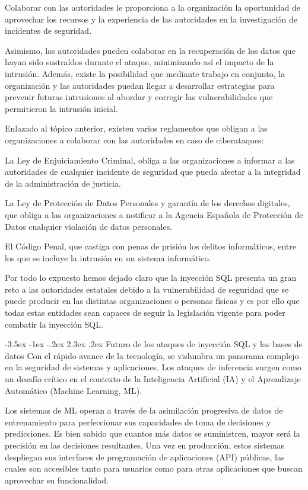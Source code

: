 \documentclass[11pt]{report}
\makeatletter
\renewcommand\chapter{\@startsection{chapter}{0}{\z@}%
    {-3.5ex \@plus -1ex \@minus -.2ex}%
    {2.3ex \@plus.2ex}%
    {\normalfont\Large\bfseries}}
\makeatother
\begin{document}
Colaborar con las autoridades le proporciona a la organización la oportunidad de aprovechar los recursos y la experiencia de las autoridades en la investigación de incidentes de seguridad. 

Asimismo, las autoridades pueden colaborar en la recuperación de los datos que hayan sido sustraídos durante el ataque, minimizando así el impacto de la intrusión. 
Además, existe la posibilidad que mediante  trabajo en conjunto, la organización y las autoridades puedan llegar a desarrollar estrategias para prevenir futuras
intrusiones al abordar y corregir las vulnerabilidades que permitieron la intrusión inicial.

Enlazado al tópico anterior, existen varios reglamentos que obligan a las organizaciones a colaborar con las autoridades en caso de ciberataques:

La Ley de Enjuiciamiento Criminal, obliga a las organizaciones a informar a las autoridades de cualquier incidente de seguridad que pueda afectar a la integridad
de la administración de justicia.

La Ley de Protección de Datos Personales y garantía de los derechos digitales, que obliga a las organizaciones a notificar a la Agencia Española de Protección de Datos cualquier violación
de datos personales.

El Código Penal, que castiga con penas de prisión los delitos informáticos, entre los que se incluye la intrusión en un sistema informático.

Por todo lo expuesto hemos dejado claro que la inyección SQL presenta un gran reto a las autoridades estatales debido a la vulnerabilidad de seguridad que se puede producir en
las distintas organizaciones o personas físicas y es por ello que todas estas entidades sean capaces de seguir la legislación vigente para poder combatir la inyección SQL.

\cleardoublepage

\chapter{Futuro de los ataques de inyección SQL y las bases de datos}
Con el rápido avance de la tecnología, se vislumbra un panorama complejo en la seguridad de sistemas y aplicaciones. Los ataques de inferencia surgen 
como un desafío crítico en el contexto de la Inteligencia Artificial (IA) y el Aprendizaje Automático (Machine Learning, ML).

Los sistemas de ML operan a través de la asimilación progresiva de datos de entrenamiento para perfeccionar sus capacidades de toma de decisiones y 
predicciones. Es bien sabido que cuantos más datos se suministren, mayor será la precisión en las decisiones resultantes. Una vez en producción, 
estos sistemas despliegan sus interfaces de programación de aplicaciones (API) públicas, las cuales son accesibles tanto para usuarios como para 
otras aplicaciones que buscan aprovechar su funcionalidad.
	
\end{document}
